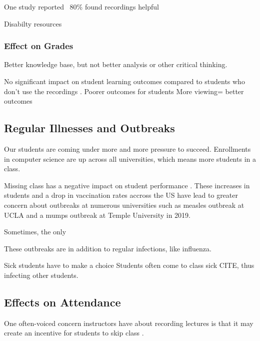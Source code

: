 \documentclass[sigconf]{acmart}
\begin{document}
One study reported ~80\% found recordings helpful \cite{maynor2013student}


Disabilty resources

\subsubsection{Effect on Grades}

Better knowledge base, but not better analysis or other critical thinking.\cite{bos2016use}



No significant impact on student learning outcomes compared to students who don't use the recordings \cite{leadbeater2013evaluating}.
Poorer outcomes for students \cite{johnston2013digital}
More viewing= better outcomes 
\cite{traphagan2010impact}
\subsection{Regular Illnesses and Outbreaks}
Our students are coming under more and more pressure to succeed.  
Enrollments in computer science are up across all universities, which means more students in a class. 

Missing class has a negative impact on student performance \cite{traphagan2010impact}.
These increases in students and a drop in vaccination rates accross the US have lead to greater concern about outbreaks at numerous universities such as measles outbreak at UCLA \cite{uclameas} and a mumps outbreak at Temple University \cite{emezienna2019resurgence} in 2019.

Sometimes, the only 

These outbreaks are in addition to regular infections, like influenza. 


Sick students have to make a choice
Students often come to class sick CITE, thus infecting other students.








\subsection{Effects on Attendance}
One often-voiced concern instructors have about recording lectures is that it may create an incentive for students to skip class \cite{larkin2010but} \cite{young2008lectures}.
\end{document}
